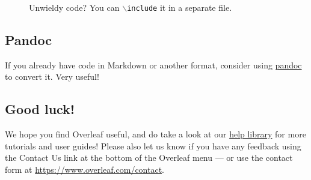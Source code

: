 \documentclass{article}
\begin{document}
\begin{figure}
    \centering
    
    \caption{Unwieldy code? You can \texttt{$\backslash$include} it in a separate file. }
    \label{fig:tikz2}
\end{figure}

\subsection{Pandoc}
If you already have code in Markdown or another format, consider using \href{https://pandoc.org/demos.html}{pandoc} to convert it. Very useful!



\subsection{Good luck!}

We hope you find Overleaf useful, and do take a look at our \href{https://www.overleaf.com/learn}{help library} for more tutorials and user guides! Please also let us know if you have any feedback using the Contact Us link at the bottom of the Overleaf menu --- or use the contact form at \url{https://www.overleaf.com/contact}.



\end{document}
